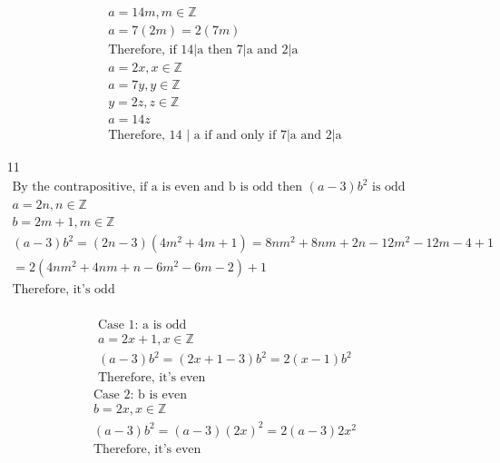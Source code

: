 \documentclass[12pt]{article}
\begin{document}
\begin{enumerate}
	    \begin{equation*}
	    	\begin{split}
		    a = 14m, m \in \mathbb{Z}\\
		    a = 7(2m) = 2(7m)\\
		    \text{Therefore, if 14|a then 7|a and 2|a}\\
		    a = 2x, x \in \mathbb{Z}\\
		    a = 7y, y \in \mathbb{Z}\\
		    y = 2z, z \in \mathbb{Z}\\
		    a = 14z\\
		    \text{Therefore, 14 | a if and only if 7|a and 2|a}
	    	\end{split}
	    \end{equation*}
	\item [11] 
	    \begin{equation*}
	    	\begin{split}
		    \text{By the contrapositive, if a is even and b is odd then $(a-3)b^2$ is odd}\\
		    a = 2n, n \in \mathbb{Z}\\
		    b = 2m + 1, m \in \mathbb{Z}\\
		    (a-3)b^2 = (2n - 3)(4m^2 + 4m + 1) = 8nm^2 + 8nm + 2n - 12m^2 - 12m -4 + 1\\
		    = 2(4nm^2 + 4nm + n - 6m^2 - 6m - 2) + 1\\
		    \text{Therefore, it's odd}\\
	    	\end{split}
	    \end{equation*}
	    \begin{multicols}{2}
		\begin{equation*}
			\begin{split}
			    \text{Case 1: a is odd}\\
			    a = 2x + 1, x \in \mathbb{Z}\\
			    (a-3)b^2 = (2x + 1 -3)b^2 = 2(x-1)b^2\\
			    \text{Therefore, it's even}
			\end{split}
		\end{equation*}
		\begin{equation*}
			\begin{split}
			    \text{Case 2: b is even}\\
			    b = 2x, x \in \mathbb{Z}\\
			    (a-3)b^2 = (a-3)(2x)^2 = 2(a-3)2x^2\\
			    \text{Therefore, it's even}

\end{split}
\end{equation*}
\end{multicols}
\end{enumerate}
\end{document}
